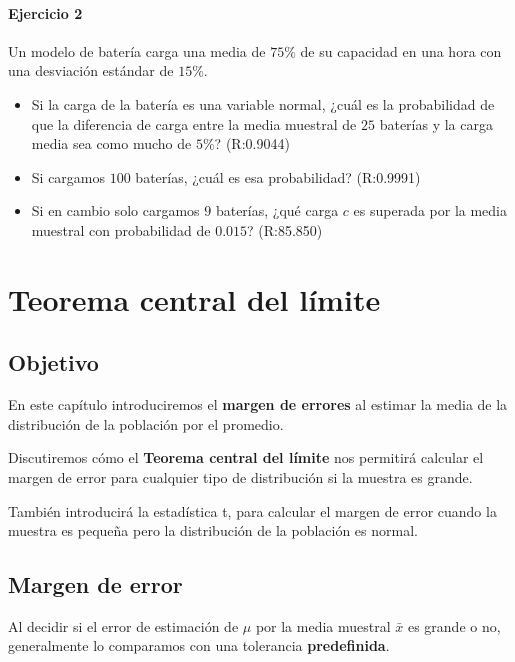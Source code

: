 \documentclass[
]{book}
\begin{document}
\hypertarget{ejercicio-2-7}{%
\subsubsection{Ejercicio 2}\label{ejercicio-2-7}}

Un modelo de batería carga una media de \(75\%\) de su capacidad en una hora con una desviación estándar de \(15\%\).

\begin{itemize}
\item
  Si la carga de la batería es una variable normal, ¿cuál es la probabilidad de que la diferencia de carga entre la media muestral de \(25\) baterías y la carga media sea como mucho de \(5\%\)? (R:0.9044)
\item
  Si cargamos \(100\) baterías, ¿cuál es esa probabilidad? (R:0.9991)
\item
  Si en cambio solo cargamos \(9\) baterías, ¿qué carga \(c\) es superada por la media muestral con probabilidad de \(0.015\)? (R:85.850)
\end{itemize}

\hypertarget{teorema-central-del-luxedmite}{%
\chapter{Teorema central del límite}\label{teorema-central-del-luxedmite}}

\hypertarget{objetivo-7}{%
\section{Objetivo}\label{objetivo-7}}

En este capítulo introduciremos el \textbf{margen de errores} al estimar la media de la distribución de la población por el promedio.

Discutiremos cómo el \textbf{Teorema central del límite } nos permitirá calcular el margen de error para cualquier tipo de distribución si la muestra es grande.

También introducirá la estadística t, para calcular el margen de error cuando la muestra es pequeña pero la distribución de la población es normal.

\hypertarget{margen-de-error}{%
\section{Margen de error}\label{margen-de-error}}

Al decidir si el error de estimación de \(\mu\) por la media muestral \(\bar{x}\) es grande o no, generalmente lo comparamos con una tolerancia \textbf{predefinida}.
\end{document}
